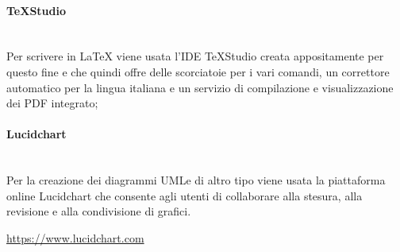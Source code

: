             \paragraph{TeXStudio}\mbox{}\\ [1mm]
                Per scrivere in \LaTeX \xspace viene usata l'IDE TeXStudio creata appositamente per questo fine e che quindi offre delle scorciatoie
                per i vari comandi, un correttore automatico per la lingua italiana e un servizio di compilazione e visualizzazione dei PDF integrato;
            \paragraph{Lucidchart}\mbox{}\\ [1mm]
                Per la creazione dei diagrammi UML\glosp e di altro tipo viene usata la piattaforma online Lucidchart che consente agli utenti di collaborare alla stesura, alla revisione e alla condivisione di grafici. \newline \newline
                \centerline{\url{https://www.lucidchart.com}}